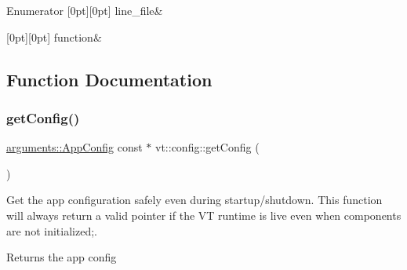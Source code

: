 \begin{DoxyEnumFields}{Enumerator}
[0pt][0pt]{}\mbox{\label{namespacevt_1_1config_a724e99568632cc0fe9c456c2230270d0a761d0adb1e300a27f04ef50f3fff51f6}} 
line\+\_\+file&\\
\hline

[0pt][0pt]{}\mbox{\label{namespacevt_1_1config_a724e99568632cc0fe9c456c2230270d0a479a398ca7c07756b7f07ee19cb9b183}} 
function&\\
\hline

\end{DoxyEnumFields}


\subsection{Function Documentation}
\mbox{\label{namespacevt_1_1config_a1074763aad1aa8a8e788a79e014fd82b}} 
\subsubsection{\texorpdfstring{get\+Config()}{getConfig()}}
{\footnotesize\ttfamily \hyperlink{structvt_1_1arguments_1_1_app_config}{arguments\+::\+App\+Config} const  $\ast$ vt\+::config\+::get\+Config (\begin{DoxyParamCaption}{ }\end{DoxyParamCaption})\hspace{0.3cm}{\ttfamily [inline]}}



Get the app configuration safely even during startup/shutdown. This function will always return a valid pointer if the VT runtime is live even when components are not initialized;. 

\begin{DoxyReturn}{Returns}
the app config 
\end{DoxyReturn}
\mbox{\label{namespacevt_1_1config_a449841f4d156e80bd15d6c6fdfa78790}} 
